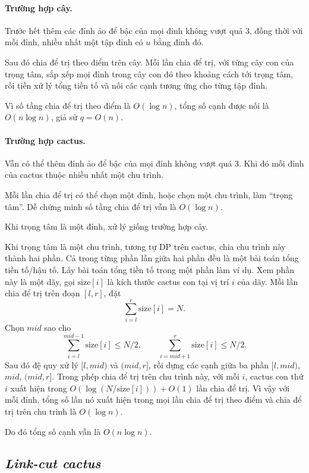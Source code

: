 \documentclass[11pt]{article}
\begin{document}
\paragraph{Trường hợp cây.}
Trước hết thêm các đỉnh ảo để bậc của mọi đỉnh không vượt quá \(3\), đồng thời
với mỗi đỉnh, nhiều nhất một tập đỉnh có \(u\) bằng đỉnh đó.

Sau đó chia để trị theo điểm trên cây. Mỗi lần chia để trị, với từng cây con
của trọng tâm, sắp xếp mọi đỉnh trong cây con đó theo khoảng cách tới trọng
tâm, rồi tiền xử lý tổng tiền tố và nối các cạnh tương ứng cho từng tập đỉnh.

Vì số tầng chia để trị theo điểm là \(O(\log n)\), tổng số cạnh được nối là
\(O(n\log n)\), giả sử \(q=O(n)\).

\paragraph{Trường hợp cactus.}
Vẫn có thể thêm đỉnh ảo để bậc của mọi đỉnh không vượt quá \(3\). Khi đó mỗi
đỉnh của cactus thuộc nhiều nhất một chu trình.

Mỗi lần chia để trị có thể chọn một đỉnh, hoặc chọn một chu trình, làm ``trọng
tâm''. Dễ chứng minh số tầng chia để trị vẫn là \(O(\log n)\).

Khi trọng tâm là một đỉnh, xử lý giống trường hợp cây.

Khi trọng tâm là một chu trình, tương tự DP trên cactus, chia chu trình này
thành hai phần. Cả trong từng phần lẫn giữa hai phần đều là một bài toán tổng
tiền tố/hậu tố. Lấy bài toán tổng tiền tố trong một phần làm ví dụ. Xem phần
này là một dãy, gọi \(\mathrm{size}[i]\) là kích thước cactus con tại vị trí
\(i\) của dãy. Mỗi lần chia để trị trên đoạn \([l,r]\), đặt
\[
  \sum_{i=l}^{r}\mathrm{size}[i]=N.
\]
Chọn \(mid\) sao cho
\[
  \sum_{i=l}^{mid-1}\mathrm{size}[i]\le N/2,\qquad
  \sum_{i=mid+1}^{r}\mathrm{size}[i]\le N/2.
\]
Sau đó đệ quy xử lý \([l,mid)\) và \((mid,r]\), rồi dựng các cạnh giữa ba phần
\([l,mid)\), \(mid\), \((mid,r]\). Trong phép chia để trị trên chu trình này,
với mỗi \(i\), cactus con thứ \(i\) xuất hiện trong
\(O(\log(N/\mathrm{size}[i]))+O(1)\) lần chia để trị. Vì vậy với mỗi đỉnh,
tổng số lần nó xuất hiện trong mọi lần chia để trị theo điểm và chia để trị
trên chu trình là \(O(\log n)\).

Do đó tổng số cạnh vẫn là \(O(n\log n)\).

\subsection{\texorpdfstring{\emph{Link-cut cactus}}{Link-cut cactus}}
\end{document}
